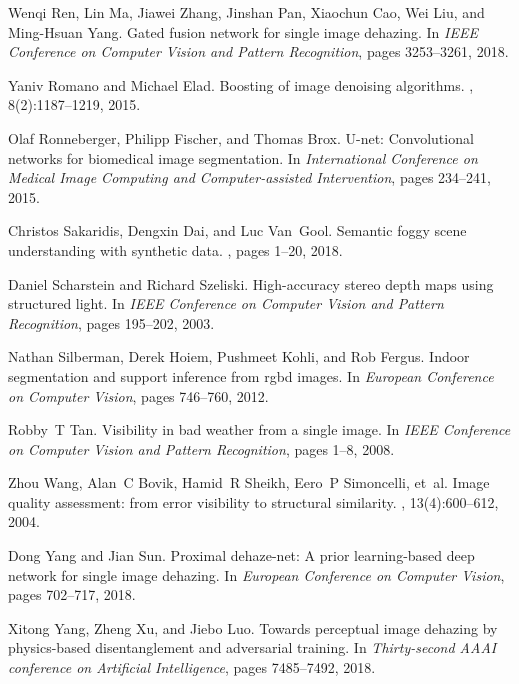 \documentclass[10pt,twocolumn,letterpaper]{article}
\begin{document}
\begin{thebibliography}{10}
Wenqi Ren, Lin Ma, Jiawei Zhang, Jinshan Pan, Xiaochun Cao, Wei Liu, and
  Ming-Hsuan Yang.
\newblock Gated fusion network for single image dehazing.
\newblock In {\em IEEE Conference on Computer Vision and Pattern Recognition},
  pages 3253--3261, 2018.

Yaniv Romano and Michael Elad.
\newblock Boosting of image denoising algorithms.
, 8(2):1187--1219, 2015.

Olaf Ronneberger, Philipp Fischer, and Thomas Brox.
\newblock U-net: Convolutional networks for biomedical image segmentation.
\newblock In {\em International Conference on Medical Image Computing and
  Computer-assisted Intervention}, pages 234--241, 2015.

Christos Sakaridis, Dengxin Dai, and Luc Van~Gool.
\newblock Semantic foggy scene understanding with synthetic data.
, pages 1--20, 2018.

Daniel Scharstein and Richard Szeliski.
\newblock High-accuracy stereo depth maps using structured light.
\newblock In {\em IEEE Conference on Computer Vision and Pattern Recognition},
  pages 195--202, 2003.

Nathan Silberman, Derek Hoiem, Pushmeet Kohli, and Rob Fergus.
\newblock Indoor segmentation and support inference from rgbd images.
\newblock In {\em European Conference on Computer Vision}, pages 746--760,
  2012.

Robby~T Tan.
\newblock Visibility in bad weather from a single image.
\newblock In {\em IEEE Conference on Computer Vision and Pattern Recognition},
  pages 1--8, 2008.

Zhou Wang, Alan~C Bovik, Hamid~R Sheikh, Eero~P Simoncelli, et~al.
\newblock Image quality assessment: from error visibility to structural
  similarity.
, 13(4):600--612, 2004.

Dong Yang and Jian Sun.
\newblock Proximal dehaze-net: A prior learning-based deep network for single
  image dehazing.
\newblock In {\em European Conference on Computer Vision}, pages 702--717,
  2018.

Xitong Yang, Zheng Xu, and Jiebo Luo.
\newblock Towards perceptual image dehazing by physics-based disentanglement
  and adversarial training.
\newblock In {\em Thirty-second AAAI conference on Artificial Intelligence},
  pages 7485--7492, 2018.


\end{thebibliography}
\end{document}
